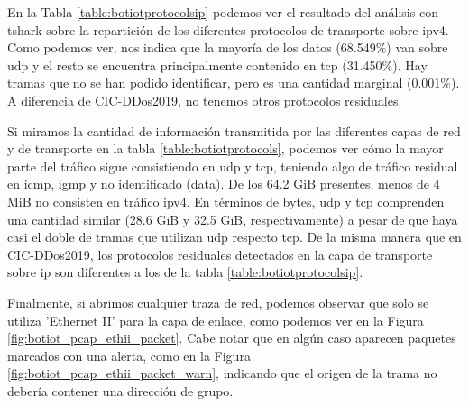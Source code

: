 En la Tabla \ref{table:botiotprotocolsip} podemos ver el resultado del análisis con tshark sobre la repartición de los diferentes protocolos de transporte sobre \acrshort{ipv4}. Como podemos ver, nos indica que la mayoría de los datos (68.549\%) van sobre \acrshort{udp} y el resto se encuentra principalmente contenido en \acrshort{tcp} (31.450\%). Hay tramas que no se han podido identificar, pero es una cantidad marginal (0.001\%). A diferencia de CIC-DDos2019, no tenemos otros protocolos residuales.



Si miramos la cantidad de información transmitida por las diferentes capas de red y de transporte en la tabla \ref{table:botiotprotocols}, podemos ver cómo la mayor parte del tráfico sigue consistiendo en \acrshort{udp} y \acrshort{tcp}, teniendo algo de tráfico residual en \acrshort{icmp}, \acrshort{igmp} y no identificado (data). De los 64.2 GiB presentes, menos de 4 MiB no consisten en tráfico \acrshort{ipv4}. En términos de bytes, \acrshort{udp} y \acrshort{tcp} comprenden una cantidad similar (28.6 GiB y 32.5 GiB, respectivamente) a pesar de que haya casi el doble de tramas que utilizan \acrshort{udp} respecto \acrshort{tcp}. De la misma manera que en CIC-DDos2019, los protocolos residuales detectados en la capa de transporte sobre \acrshort{ip} son diferentes a los de la tabla \ref{table:botiotprotocolsip}.



Finalmente, si abrimos cualquier traza de red, podemos observar que solo se utiliza 'Ethernet II' para la capa de enlace, como podemos ver en la Figura \ref{fig:botiot_pcap_ethii_packet}. Cabe notar que en algún caso aparecen paquetes marcados con una alerta, como en la Figura \ref{fig:botiot_pcap_ethii_packet_warn}, indicando que el origen de la trama no debería contener una dirección de grupo.

